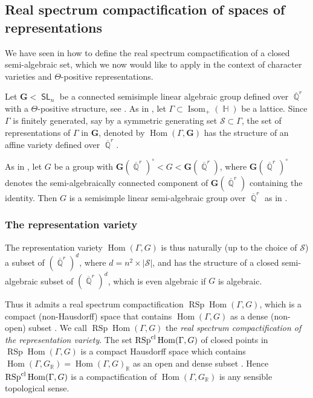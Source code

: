 \documentclass{amsart}
\theoremstyle{plain}
\theoremstyle{definition}
\DeclareMathOperator{\SL}{\mathsf{SL}}
\DeclareMathOperator{\Hom}{Hom}
\DeclareMathOperator{\Isom}{Isom}
\DeclareMathOperator{\rsp}{RSp}
\DeclareMathOperator{\Hb}{\mathbb{H}}
\DeclareMathOperator{\Rb}{{\mathbb{R}}}
\DeclareMathOperator{\Qb}{\mathbb{Q}}
\newcommand{\cl}{\textnormal{cl}}
\newcommand{\Qbar}{\overline{\Qb}^r}
\newcommand{\1}{\mathbf{1}}
\begin{document}
\subsection{Real spectrum compactification of spaces of representations}
\label{s: Real Sectrum}

We have seen in  how to define the real spectrum compactification of a closed semi-algebraic set,  which we now would like to apply in the context of character varieties and $\Theta$-positive representations.

Let $\mathbf{G}<\mathbf{\SL}_n$ be a connected semisimple linear algebraic group defined over $\overline{\Qb}^r$ with a $\Theta$-positive structure, see .
As in , let $\Gamma \subset \Isom_+(\Hb)$ be a lattice.
Since $\Gamma$ is finitely generated, say by a symmetric generating set $\mathcal{S} \subset \Gamma$, 
the set of representations of $\Gamma$ in $\mathbf{G}$, denoted by $\Hom(\Gamma,\mathbf{G})$ has the structure of an affine variety defined over $\overline{\Qb}^r$.

As in , let $G$ be a group with $\mathbf{G}(\overline{\Qb}^r)^\circ < G < \mathbf{G}(\overline{\Qb}^r)$, where $\mathbf{G}(\overline{\Qb}^r)^\circ$ denotes the semi-algebraically connected component of $\mathbf{G}(\overline{\Qb}^r)$ containing the identity.
Then $G$ is a semisimple linear semi-algebraic group over $\Qbar$ as in .

\subsubsection{The representation variety}
The representation variety $\Hom(\Gamma,G)$ is thus naturally (up to the choice of $\mathcal{S}$) a subset of $(\overline{\Qb}^r)^d$, where $d = n^2 \times |\mathcal{S}|$, and has the structure of a closed semi-algebraic subset of $(\overline{\Qb}^r)^d$, which is even algebraic if $G$ is algebraic.

Thus it admits a real spectrum compactification $\rsp\Hom(\Gamma, G)$, which is a compact (non-Hausdorff) space that contains $\Hom(\Gamma, G)$ as a dense (non-open) subset \cite{BochnakCosteRoy_RealAlgebraicGeometry}.
We call $\rsp\Hom(\Gamma, G)$ the \emph{real spectrum compactification of the representation variety}.
The set $\rsp^{\cl}\Hom(\Gamma, G)$ of closed points in $\rsp\Hom(\Gamma, G)$ is a compact Hausdorff space which contains $\Hom(\Gamma, G_{\Rb}) = \Hom(\Gamma,G)_{\Rb}$ as an open and dense subset \cite[Section 1.1]{BurgerIozziParreauPozzetti_RSCCharacterVarieties2}.
Hence $\rsp^{\cl} \Hom(\Gamma, G)$ is a compactification of $\Hom(\Gamma,G_{\Rb})$ is any sensible topological sense.
\end{document}
